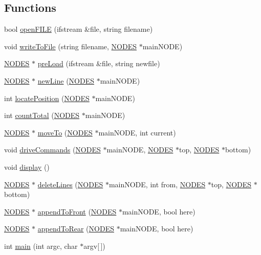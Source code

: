 \subsection*{Functions}
\begin{DoxyCompactItemize}
\item 
bool \hyperlink{_mansfield-_a_s_s_n1-_d_l_l_prog_8cpp_a804cdd11c8f26f1f9da29dde3b6430c7}{openFILE} (ifstream \&file, string filename)
\item 
void \hyperlink{_mansfield-_a_s_s_n1-_d_l_l_prog_8cpp_a48868a5b03c344c30d31e1d3eeb3fb20}{writeToFile} (string filename, \hyperlink{struct_n_o_d_e_s}{NODES} $\ast$mainNODE)
\item 
\hyperlink{struct_n_o_d_e_s}{NODES} $\ast$ \hyperlink{_mansfield-_a_s_s_n1-_d_l_l_prog_8cpp_acb74ac9d8a582d98c9b8e5d30e668b3b}{preLoad} (ifstream \&file, string newfile)
\item 
\hyperlink{struct_n_o_d_e_s}{NODES} $\ast$ \hyperlink{_mansfield-_a_s_s_n1-_d_l_l_prog_8cpp_a067d5d7756dc9548a7abc1879667cac6}{newLine} (\hyperlink{struct_n_o_d_e_s}{NODES} $\ast$mainNODE)
\item 
int \hyperlink{_mansfield-_a_s_s_n1-_d_l_l_prog_8cpp_ac48593b3e6a07f7ea402192ee86da930}{locatePosition} (\hyperlink{struct_n_o_d_e_s}{NODES} $\ast$mainNODE)
\item 
int \hyperlink{_mansfield-_a_s_s_n1-_d_l_l_prog_8cpp_a6bb55d1150938492268de6d1ef9e0c8a}{countTotal} (\hyperlink{struct_n_o_d_e_s}{NODES} $\ast$mainNODE)
\item 
\hyperlink{struct_n_o_d_e_s}{NODES} $\ast$ \hyperlink{_mansfield-_a_s_s_n1-_d_l_l_prog_8cpp_a656c06175f3fa777eeb11ef4192e0ada}{moveTo} (\hyperlink{struct_n_o_d_e_s}{NODES} $\ast$mainNODE, int current)
\item 
void \hyperlink{_mansfield-_a_s_s_n1-_d_l_l_prog_8cpp_a75120516af7833473175d542cdbdd08b}{driveCommands} (\hyperlink{struct_n_o_d_e_s}{NODES} $\ast$mainNODE, \hyperlink{struct_n_o_d_e_s}{NODES} $\ast$top, \hyperlink{struct_n_o_d_e_s}{NODES} $\ast$bottom)
\item 
void \hyperlink{_mansfield-_a_s_s_n1-_d_l_l_prog_8cpp_a1e5b20fed15743656bb6d2e6a6ea6269}{display} ()
\item 
\hyperlink{struct_n_o_d_e_s}{NODES} $\ast$ \hyperlink{_mansfield-_a_s_s_n1-_d_l_l_prog_8cpp_a02e3a75e02b9cef0b36bd49b1443e9a3}{deleteLines} (\hyperlink{struct_n_o_d_e_s}{NODES} $\ast$mainNODE, int from, \hyperlink{struct_n_o_d_e_s}{NODES} $\ast$top, \hyperlink{struct_n_o_d_e_s}{NODES} $\ast$bottom)
\item 
\hyperlink{struct_n_o_d_e_s}{NODES} $\ast$ \hyperlink{_mansfield-_a_s_s_n1-_d_l_l_prog_8cpp_aa2a740fb81a6ccda6237e73bcac6d056}{appendToFront} (\hyperlink{struct_n_o_d_e_s}{NODES} $\ast$mainNODE, bool here)
\item 
\hyperlink{struct_n_o_d_e_s}{NODES} $\ast$ \hyperlink{_mansfield-_a_s_s_n1-_d_l_l_prog_8cpp_a8a9d6e1144ceefc651887b4463dd1b2a}{appendToRear} (\hyperlink{struct_n_o_d_e_s}{NODES} $\ast$mainNODE, bool here)
\item 
int \hyperlink{_mansfield-_a_s_s_n1-_d_l_l_prog_8cpp_a0ddf1224851353fc92bfbff6f499fa97}{main} (int argc, char $\ast$argv\mbox{[}$\,$\mbox{]})
\end{DoxyCompactItemize}


